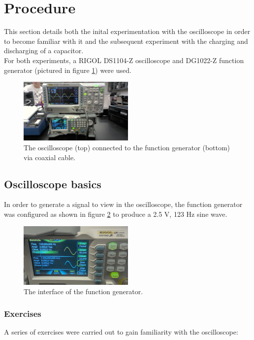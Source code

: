 \documentclass{article}
\begin{document}
\section{Procedure}
    This section details both the inital experimentation with the oscilloscope in order to become familiar with it and the subsequent experiment with the charging and discharging of a capacitor.\\ %
    For both experiments, a RIGOL DS1104-Z oscilloscope and DG1022-Z function generator (pictured in figure \ref{oscnfunc1}) were used.

    \begin{figure}
        \centering
        \includegraphics[width=0.5\textwidth]{WIN_20240927_13_48_12_Pro.jpg} %
        \caption{The oscilloscope (top) connected to the function generator (bottom) via coaxial cable.}
        \label{oscnfunc1}
    \end{figure}

    \subsection{Oscilloscope basics}
        In order to generate a signal to view in the oscilloscope, the function generator was configured as shown in figure \ref{funcgen1} to produce a 2.5 V, 123 Hz sine wave.

        \begin{figure}
            \centering
            \includegraphics[width=0.5\textwidth]{WIN_20240927_13_51_59_Pro.jpg}
            \caption{The interface of the function generator.}
            \label{funcgen1}
        \end{figure}

        \subsubsection{Exercises}
            A series of exercises were carried out to gain familiarity with the oscilloscope:
\end{document}
